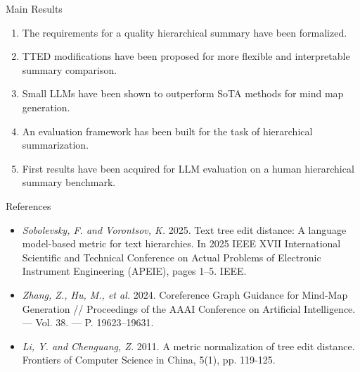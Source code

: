 \documentclass[aspectratio=169]{beamer}
\begin{document}
\begin{frame}{Main Results}

\begin{enumerate}
    \item The requirements for a quality hierarchical summary have been formalized.
    \item TTED modifications have been proposed for more flexible and interpretable summary comparison.
    \item Small LLMs have been shown to outperform SoTA methods for mind map generation.
    \item An evaluation framework has been built for the task of hierarchical summarization.
    \item First results have been acquired for LLM evaluation on a human hierarchical summary benchmark.
\end{enumerate}

\end{frame}


\begin{frame}{References}

\begin{itemize}
    \item \textit{Sobolevsky, F. and Vorontsov, K.} 2025. Text tree edit distance: A language model-based metric for text hierarchies. In 2025 IEEE XVII International Scientific and Technical Conference on Actual Problems of Electronic Instrument Engineering (APEIE), pages 1–5. IEEE.
    \item \textit{Zhang, Z., Hu, M., et al.} 2024. Coreference Graph Guidance for Mind-Map Generation // Proceedings of the AAAI Conference on Artificial Intelligence. — Vol. 38. — P. 19623–19631.
    \item \textit{Li, Y. and Chenguang, Z.} 2011. A metric normalization of tree edit distance. Frontiers of Computer Science in China, 5(1), pp. 119-125.
\end{itemize}

\end{frame}

\end{document}
